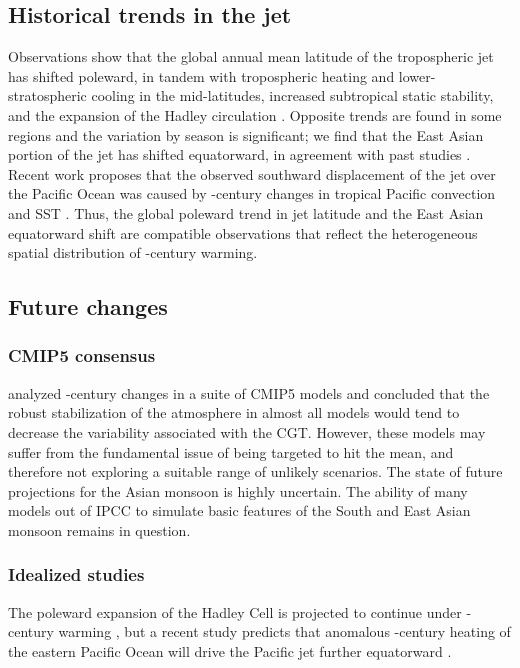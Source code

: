 \subsection{Historical trends in the jet}
	Observations show that the global annual mean latitude of the tropospheric jet has shifted poleward, in tandem with tropospheric heating and lower-stratospheric cooling in the mid-latitudes, increased subtropical static stability, and the expansion of the Hadley circulation \citep{Fu2006,Archer2008,Fu2011}. Opposite trends are found in some regions and the variation by season is significant; we find that the East Asian portion of the jet has shifted equatorward, in agreement with past studies \citep{Yu2007, Archer2008}. Recent work proposes that the observed southward displacement of the jet over the Pacific Ocean was caused by -century changes in tropical Pacific convection and SST \citep{Park2014a}. Thus, the global poleward trend in jet latitude and the East Asian equatorward shift are compatible observations that reflect the heterogeneous spatial distribution of -century warming.

\subsection{Future changes}
\subsubsection{CMIP5 consensus}
	\citet{Lee2014} analyzed -century changes in a suite of CMIP5 models and concluded that the robust stabilization of the atmosphere in almost all models would tend to decrease the variability associated with the CGT. However, these models may suffer from the fundamental issue of being targeted to hit the mean, and therefore not exploring a suitable range of unlikely scenarios. The state of future projections for the Asian monsoon is highly uncertain. The ability of many models out of IPCC to simulate basic features of the South and East Asian monsoon remains in question.

\subsubsection{Idealized studies}
	The poleward expansion of the Hadley Cell is projected to continue under -century warming \citep{Frierson2007,Lu2007,Kang2012}, but a recent study predicts that anomalous -century heating of the eastern Pacific Ocean will drive the Pacific jet further equatorward \citep{Park2014}.
	
